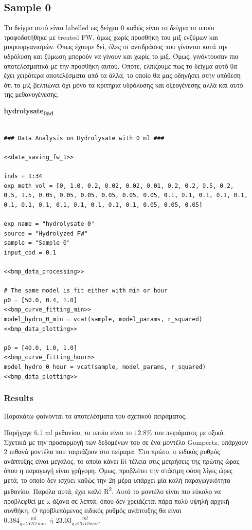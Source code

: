 \documentclass[11pt]{article}
\begin{document}
\subsection{Sample 0}
\label{sec:orgdd6fa71}
Το δείγμα αυτό είναι labelled ως δείγμα 0 καθώς είναι το δείγμα το οποίο τροφοδοτήθηκε με treated FW, όμως χωρίς προσθήκη του μιξ ενζύμων και μικροοργανισμών. Όπως έχουμε δεί, όλες οι αντιδράσεις που γίνονται κατά την υδρόλυση και ζύμωση μπορούν να γίνουν και χωρίς το μιξ. Όμως, γινόντουσαν πιο αποτελεσματικά με την προσθήκη αυτού. Οπότε, ελπίζουμε πως το δείγμα αυτό θα έχει χειρότερα αποτελέσματα από τα άλλα, το οποίο θα μας οδηγήσει στην υπόθεση ότι το μιξ βελτιώνει όχι μόνο τα κριτήρια υδρόλυσης και οξεογένεσης αλλά και αυτό της μεθανογένεσης.

\textbf{hydrolysate\textsubscript{0}\textsubscript{ad}}
\begin{verbatim}

### Data Analysis on Hydrolysate with 0 ml ###

<<date_saving_fw_1>>

inds = 1:34
exp_meth_vol = [0, 1.0, 0.2, 0.02, 0.02, 0.01, 0.2, 0.2, 0.5, 0.2, 0.5, 1.5, 0.05, 0.05, 0.05, 0.05, 0.05, 0.05, 0.1, 0.1, 0.1, 0.1, 0.1, 0.1, 0.1, 0.1, 0.1, 0.1, 0.1, 0.1, 0.1, 0.05, 0.05, 0.05]

exp_name = "hydrolysate_0"
source = "Hydrolyzed FW"
sample = "Sample 0"
input_cod = 0.1

<<bmp_data_processing>>

# The same model is fit either with min or hour
p0 = [50.0, 0.4, 1.0]
<<bmp_curve_fitting_min>>
model_hydro_0_min = vcat(sample, model_params, r_squared)
<<bmp_data_plotting>>

p0 = [40.0, 1.0, 1.0]
<<bmp_curve_fitting_hour>>
model_hydro_0_hour = vcat(sample, model_params, r_squared)
<<bmp_data_plotting>>
\end{verbatim}

\subsubsection{Results}
\label{sec:org455895d}
Παρακάτω φαίνονται τα αποτελέσματα του σχετικού πειράματος.

Παρήγαγε 6.1 ml μεθανίου, το οποίο είναι το \(12.8 \%\) του πειράματος με οξικό. Σχετικά με την προσαρμογή των δεδομένων του σε ένα μοντέλο Gompertz, υπάρχουν 2 πιθανά μοντέλα που ταιριάζουν στο πείραμα. Στο πρώτο, ο ειδικός ρυθμός ανάπτυξης είναι μεγάλος, το οποίο κάνει fit τέλεια στις μετρήσεις της πρώτης ώρας όπου η παραγωγή είναι γρήγορη. Όμως, προβλέπει την στάσιμη φάση λίγες ώρες μετά, το οποίο δεν ισχύει καθώς την 2η μέρα υπάρχει μία καλή παραγωγικότητα μεθανίου. Παρόλα αυτά, έχει καλό R\textsuperscript{2}. Αυτό το μοντέλο είναι πιο εύκολο να προβλεφθεί με x άξονα σε λεπτά, όπου δεν χρειάζεται πάρα πολύ υψηλή αρχική συνθήκη. Ο προβλεπόμενος ειδικός ρυθμός ανάπτυξης θα είναι \(0.384 \frac{ml}{g ~ sCOD \min } \text{ ή } 23.03 \frac{ml}{g ~ sCOD hour}\).
\end{document}
